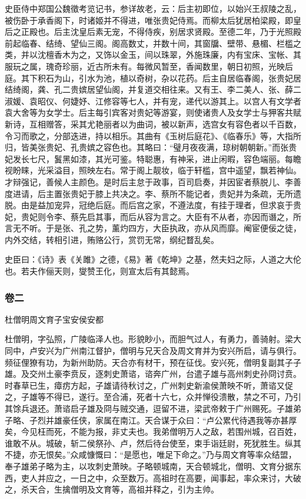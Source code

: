 \documentclass[]{article}
\begin{document}
史臣侍中郑国公魏徵考览记书，参详故老，云：后主初即位，以始兴王叔陵之乱，被伤卧于承香阁下，时诸姬并不得进，唯张贵妃侍焉。而柳太后犹居柏梁殿，即皇后之正殿也。后主沈皇后素无宠，不得侍疾，别居求贤殿。至德二年，乃于光照殿前起临春、结绮、望仙三阁。阁高数丈，并数十间，其窗牖、壁带、悬楣、栏槛之类，并以沈檀香木为之，又饰以金玉，间以珠翠，外施珠廉，内有宝床、宝帐、其服玩之属，瑰奇珍丽，近古所未有。每微风暂至，香闻数里，朝日初照，光映后庭。其下积石为山，引水为池，植以奇树，杂以花药。后主自居临春阁，张贵妃居结绮阁，龚、孔二贵嫔居望仙阁，并复道交相往来。又有王、李二美人、张、薛二淑媛、袁昭仪、何婕妤、江修容等七人，并有宠，递代以游其上。以宫人有文学者袁大舍等为女学士。后主每引宾客对贵妃等游宴，则使诸贵人及女学士与狎客共赋新诗，互相赠答，采其尤艳丽者以为曲词，被以新声，选宫女有容色者以千百数，令习而歌之，分部迭进，持以相乐。其曲有《玉树后庭花》、《临春乐》等，大指所归，皆美张贵妃、孔贵嫔之容色也。其略曰：``璧月夜夜满，琼树朝朝新。''而张贵妃发长七尺，鬒黑如漆，其光可鉴。特聪惠，有神采，进止闲暇，容色端丽。每瞻视盼睐，光采溢目，照映左右。常于阁上靓妆，临于轩槛，宫中遥望，飘若神仙。才辩强记，善候人主颜色。是时后主怠于政事，百司启奏，并因宦者蔡脱儿、李善度进请，后主置张贵妃于膝上共决之。李、蔡所不能记者，贵妃并为条疏，无所遗脱。由是益加宠异，冠绝后庭。而后宫之家，不遵法度，有挂于理者，但求哀于贵妃，贵妃则令李、蔡先启其事，而后从容为言之。大臣有不从者，亦因而谮之，所言无不听。于是张、孔之势，薰灼四方，大臣执政，亦从风而靡。阉宦便佞之徒，内外交结，转相引进，贿赂公行，赏罚无常，纲纪瞀乱矣。

史臣曰：《诗》表《关雎》之德，《易》著《乾坤》之基，然夫妇之际，人道之大伦也。若夫作俪天则，燮赞王化，则宣太后有其懿焉。

\hypertarget{header-n4292}{%
\subsubsection{卷二}\label{header-n4292}}

杜僧明周文育子宝安侯安都

杜僧明，字弘照，广陵临泽人也。形貌眇小，而胆气过人，有勇力，善骑射。梁大同中，卢安兴为广州南江督护，僧明与兄天合及周文育并为安兴所启，请与俱行。频征俚獠有功，为新州助防。天合亦有材干，预在征伐。安兴死，僧明复副其子子雄。及交州土豪李贲反，逐刺史萧谘，谘奔广州，台遣子雄与高州刺史孙冏讨贲。时春草已生，瘴疠方起，子雄请待秋讨之，广州刺史新渝侯萧映不听，萧谘又促之，子雄等不得已，遂行。至合浦，死者十六七，众并惮役溃散，禁之不可，乃引其馀兵退还。萧谘启子雄及冏与贼交通，逗留不进，梁武帝敕于广州赐死。子雄弟子略、子烈并雄豪任侠，家属在南江。天合谋于众曰：``卢公累代待遇我等亦甚厚矣，今见枉而死，不能为报，非丈夫也。我弟僧明万人之敌，若围州城，召百姓，谁敢不从。城破，斩二侯祭孙、卢，然后待台使至，束手诣廷尉，死犹胜生。纵其不捷，亦无恨矣。''众咸慷慨曰：``是愿也，唯足下命之。''乃与周文育等率众结盟，奉子雄弟子略为主，以攻刺史萧映。子略顿城南，天合顿城北，僧明、文育分据东西，吏人并应之，一日之中，众至数万。高祖时在高要，闻事起，率众来讨，大破之，杀天合，生擒僧明及文育等，高祖并释之，引为主帅。
\end{document}
